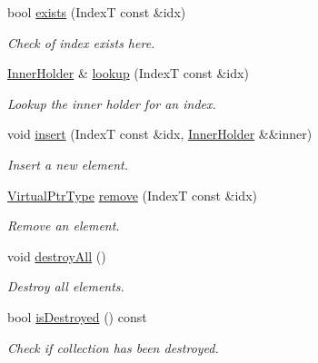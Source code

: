 \begin{DoxyCompactItemize}
\item 
bool \hyperlink{structvt_1_1vrt_1_1collection_1_1_holder_a4c50d8a3ed73908e5532974227b1bb85}{exists} (IndexT const \&idx)
\begin{DoxyCompactList}\small\item\em Check of index exists here. \end{DoxyCompactList}\item 
\hyperlink{structvt_1_1vrt_1_1collection_1_1_holder_a6c93d243ae88f38a8c5f8aa3a1ad86d8}{Inner\+Holder} \& \hyperlink{structvt_1_1vrt_1_1collection_1_1_holder_a1432de82ec0ae7aa521038f01e0b83f3}{lookup} (IndexT const \&idx)
\begin{DoxyCompactList}\small\item\em Lookup the inner holder for an index. \end{DoxyCompactList}\item 
void \hyperlink{structvt_1_1vrt_1_1collection_1_1_holder_a52d7c8a407d20668d84c3a6136b1b5d9}{insert} (IndexT const \&idx, \hyperlink{structvt_1_1vrt_1_1collection_1_1_holder_a6c93d243ae88f38a8c5f8aa3a1ad86d8}{Inner\+Holder} \&\&inner)
\begin{DoxyCompactList}\small\item\em Insert a new element. \end{DoxyCompactList}\item 
\hyperlink{structvt_1_1vrt_1_1collection_1_1_holder_a0a7eb9b25e205e5d113ec13964547a8e}{Virtual\+Ptr\+Type} \hyperlink{structvt_1_1vrt_1_1collection_1_1_holder_a7920bc627a037fa9870dea0682dce31e}{remove} (IndexT const \&idx)
\begin{DoxyCompactList}\small\item\em Remove an element. \end{DoxyCompactList}\item 
void \hyperlink{structvt_1_1vrt_1_1collection_1_1_holder_a8627b40225e0ebc51b31269f20c3516f}{destroy\+All} ()
\begin{DoxyCompactList}\small\item\em Destroy all elements. \end{DoxyCompactList}\item 
bool \hyperlink{structvt_1_1vrt_1_1collection_1_1_holder_aa66400b46cb84ee29ff6074ec2dab42d}{is\+Destroyed} () const
\begin{DoxyCompactList}\small\item\em Check if collection has been destroyed. \end{DoxyCompactList}\item 

\end{DoxyCompactItemize}
